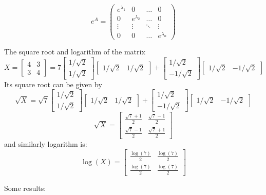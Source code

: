 \[ e^A = \begin{pmatrix} e^{\lambda_1} & 0 & \ldots & 0 \\ 0 & e^{\lambda_2} & \ldots & 0 \\ \vdots & \vdots & \ddots & \vdots \\ 0 & 0 & \ldots & e^{\lambda_n} \end{pmatrix} \]
\begin{example}
    The square root and logarithm of the matrix
    \[
    X=\begin{bmatrix} 4 & 3 \\ 3 & 4 \end{bmatrix}=7\begin{bmatrix} 1/\sqrt{2} \\ 1/\sqrt{2} \end{bmatrix} \begin{bmatrix} 1/\sqrt{2} & 1/\sqrt{2} \end{bmatrix} + \begin{bmatrix} 1/\sqrt{2} \\ -1/\sqrt{2} \end{bmatrix} \begin{bmatrix} 1/\sqrt{2} & -1/\sqrt{2} \end{bmatrix}
    \]
    Its square root can be given by
    \[
      \sqrt{X} = \sqrt{7}  \begin{bmatrix} 1/\sqrt{2} \\ 1/\sqrt{2} \end{bmatrix} \begin{bmatrix} 1/\sqrt{2} & 1/\sqrt{2} \end{bmatrix} + \begin{bmatrix} 1/\sqrt{2} \\ -1/\sqrt{2} \end{bmatrix} \begin{bmatrix} 1/\sqrt{2} & -1/\sqrt{2} \end{bmatrix}
    \]
    \[
    \sqrt{X}=\begin{bmatrix} \frac{\sqrt{7}+1}{2} & \frac{\sqrt{7}-1}{2} \\ \frac{\sqrt{7}-1}{2} & \frac{\sqrt{7}+1}{2} \end{bmatrix}
    \]
    and similarly logarithm is:
    \[
    \log(X)=\begin{bmatrix} \frac{\log(7)}{2} & \frac{\log(7)}{2} \\ \frac{\log(7)}{2} & \frac{\log(7)}{2} \end{bmatrix}
    \]
\end{example}
Some results:
